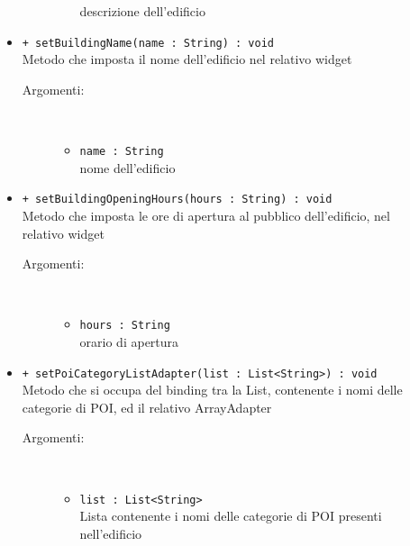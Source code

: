 \documentclass[../DefinizioneDiProdotto.tex]{subfiles}
\begin{document}
\begin{description}
\begin{itemize}
\begin{description}
\begin{itemize}
				descrizione dell'edificio\end{itemize}
		\end{description}
		\item \texttt{+ setBuildingName(name : String) : void}\\
		Metodo che imposta il nome dell'edificio nel relativo widget
		\begin{description}
			\item[Argomenti:] \
			\begin{itemize}
				\item \texttt{name : String}\\
				nome dell'edificio\end{itemize}
		\end{description}
		\item \texttt{+ setBuildingOpeningHours(hours : String) : void}\\
		Metodo che imposta le ore di apertura al pubblico dell'edificio, nel relativo widget
		\begin{description}
			\item[Argomenti:] \
			\begin{itemize}
				\item \texttt{hours : String}\\
				orario di apertura\end{itemize}
		\end{description}
		\item \texttt{+ setPoiCategoryListAdapter(list : List<String>) : void}\\
		Metodo che si occupa del binding tra la List, contenente i nomi delle categorie di POI, ed il relativo ArrayAdapter
		\begin{description}
			\item[Argomenti:] \
			\begin{itemize}
				\item \texttt{list : List<String>}\\
				Lista contenente i nomi delle categorie di POI presenti nell'edificio\end{itemize}
		\end{description}
	\end{itemize}
\end{description}
\end{document}
